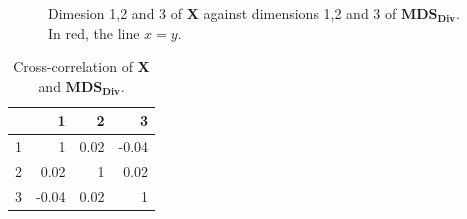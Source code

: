 \documentclass[11pt]{report}
\begin{document}
\begin{figure}[ht]
    \centering
    \qquad
    \qquad
    \caption{Dimesion 1,2 and 3 of \textbf{X} against dimensions 1,2 and 3 of  $\mathbf{MDS_{Div}}$. \newline
            In red, the line $x=y$.}%
    \label{divide_example}%
\end{figure}


\begin{table}[ht]
\centering
\begin{tabular}{rrrr}
  \hline
 & 1 & 2 & 3 \\ 
  \hline
1 & 1 & 0.02 & -0.04 \\ 
  2 & 0.02 & 1 & 0.02 \\ 
  3 & -0.04 & 0.02 & 1 \\ 
   \hline
\end{tabular}
\caption{Cross-correlation of \textbf{X} and $\mathbf{MDS_{Div}}$.} 
\label{corr_mds}
\end{table}
\end{document}
